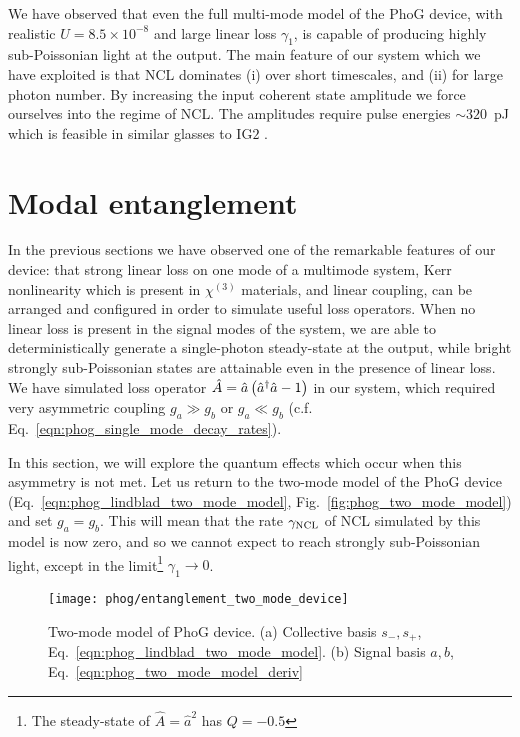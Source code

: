 We have observed that even the full multi-mode model of the PhoG device, with realistic $U=8.5\times10^{-8}$ and large linear loss $\gamma_1$, is capable of producing highly sub-Poissonian light at the output. The main feature of our system which we have exploited is that NCL dominates (i) over short timescales, and (ii) for large photon number. By increasing the input coherent state amplitude we force ourselves into the regime of NCL. The amplitudes require pulse energies $\sim 320$~pJ which is feasible in similar glasses to IG$2$ \cite{Butcher2018}.

\section{Modal entanglement}\label{sec:phog_entanglement}
In the previous sections we have observed one of the remarkable features of our device: that strong linear loss on one mode of a multimode system, Kerr nonlinearity which is present in $\chi^{\left(3\right)}$ materials, and linear coupling, can be arranged and configured in order to simulate useful loss operators. When no linear loss is present in the signal modes of the system, we are able to deterministically generate a single-photon steady-state at the output, while bright strongly sub-Poissonian states are attainable even in the presence of linear loss. We have simulated loss operator $\hat{A} = \hat{a}\left(\hat{a}^\dagger \hat{a} - 1\right)$ in our system, which required very asymmetric coupling $g_a \gg g_b$ or $g_a \ll g_b$ (c.f. Eq.~\ref{eqn:phog_single_mode_decay_rates}). 

In this section, we will explore the quantum effects which occur when this asymmetry is not met. Let us return to the two-mode model of the PhoG device (Eq.~\ref{eqn:phog_lindblad_two_mode_model}, Fig.~\ref{fig:phog_two_mode_model}) and set $g_a = g_b$. This will mean that the rate $\gamma_{\text{NCL}}$ of NCL simulated by this model is now zero, and so we cannot expect to reach strongly sub-Poissonian light, except in the limit\footnote{The steady-state of $\hat{A} = \hat{a}^2$ has $Q = -0.5$} $\gamma_1 \rightarrow 0$.

\begin{figure}[htp]
\captionsetup{width=\linewidth}
\centering
\texttt{[image: phog/entanglement\_two\_mode\_device]}
\caption{\label{fig:phog_entanglement_two_mode_device} Two-mode model of PhoG device. (a) Collective basis $s_-, s_+$, Eq.~\ref{eqn:phog_lindblad_two_mode_model}. (b) Signal basis $a, b$, Eq.~\ref{eqn:phog_two_mode_model_deriv}}
\end{figure}

